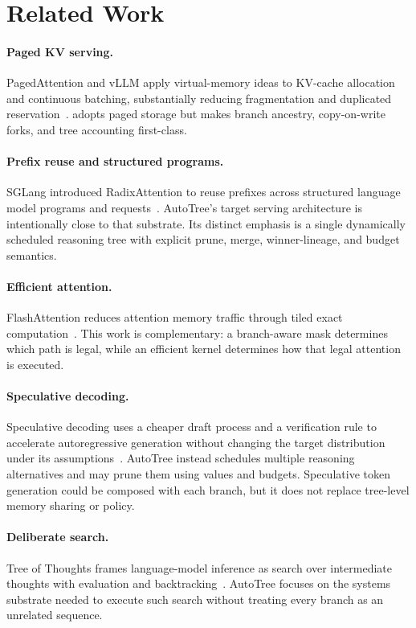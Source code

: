 \section{Related Work}

\paragraph{Paged KV serving.}
PagedAttention and vLLM apply virtual-memory ideas to KV-cache allocation and
continuous batching, substantially reducing fragmentation and duplicated
reservation~\cite{kwon2023vllm}.  \system adopts paged storage but makes branch
ancestry, copy-on-write forks, and tree accounting first-class.

\paragraph{Prefix reuse and structured programs.}
SGLang introduced RadixAttention to reuse prefixes across structured language
model programs and requests~\cite{zheng2024sglang}.  AutoTree's target serving
architecture is intentionally close to that substrate.  Its distinct emphasis
is a single dynamically scheduled reasoning tree with explicit prune, merge,
winner-lineage, and budget semantics.

\paragraph{Efficient attention.}
FlashAttention reduces attention memory traffic through tiled exact
computation~\cite{dao2022flashattention}.  This work is complementary: a
branch-aware mask determines which path is legal, while an efficient kernel
determines how that legal attention is executed.

\paragraph{Speculative decoding.}
Speculative decoding uses a cheaper draft process and a verification rule to
accelerate autoregressive generation without changing the target distribution
under its assumptions~\cite{leviathan2023speculative,chen2023speculative}.
AutoTree instead schedules multiple reasoning alternatives and may prune them
using values and budgets.  Speculative token generation could be composed with
each branch, but it does not replace tree-level memory sharing or policy.

\paragraph{Deliberate search.}
Tree of Thoughts frames language-model inference as search over intermediate
thoughts with evaluation and backtracking~\cite{yao2023tree}.  AutoTree focuses
on the systems substrate needed to execute such search without treating every
branch as an unrelated sequence.
